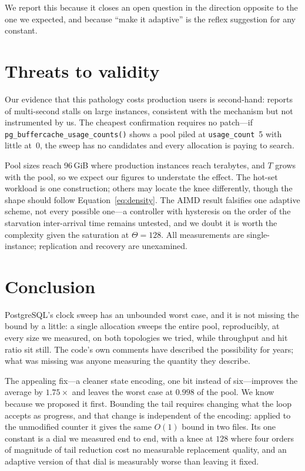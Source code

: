 \documentclass[sigconf,nonacm]{acmart}
\begin{document}
We report this because it closes an open question in the direction opposite to
the one we expected, and because ``make it adaptive'' is the reflex suggestion
for any constant.

\section{Threats to validity}

Our evidence that this pathology costs production users is second-hand: reports
of multi-second stalls on large instances, consistent with the mechanism but
not instrumented by us. The cheapest confirmation requires no patch---if
\texttt{pg\_buffercache\_usage\_counts()} shows a pool piled at
\texttt{usage\_count}~5 with little at~0, the sweep has no candidates and every
allocation is paying to search.

Pool sizes reach 96\,GiB where production instances reach terabytes, and $T$
grows with the pool, so we expect our figures to understate the effect. The
hot-set workload is one construction; others may locate the knee differently,
though the shape should follow Equation~\ref{eq:density}. The AIMD result
falsifies one adaptive scheme, not every possible one---a controller with
hysteresis on the order of the starvation inter-arrival time remains untested,
and we doubt it is worth the complexity given the saturation at $\Theta=128$.
All measurements are single-instance; replication and recovery are unexamined.

\section{Conclusion}

PostgreSQL's clock sweep has an unbounded worst case, and it is not missing the
bound by a little: a single allocation sweeps the entire pool, reproducibly, at
every size we measured, on both topologies we tried, while throughput and hit
ratio sit still. The code's own comments have described the possibility for
years; what was missing was anyone measuring the quantity they describe.

The appealing fix---a cleaner state encoding, one bit instead of six---improves
the average by $1.75\times$ and leaves the worst case at $0.998$ of the pool.
We know because we proposed it first. Bounding the tail requires changing what
the loop accepts as progress, and that change is independent of the encoding:
applied to the unmodified counter it gives the same $O(1)$ bound in two files.
Its one constant is a dial we measured end to end, with a knee at $128$ where
four orders of magnitude of tail reduction cost no measurable replacement
quality, and an adaptive version of that dial is measurably worse than leaving
it fixed.
\end{document}
